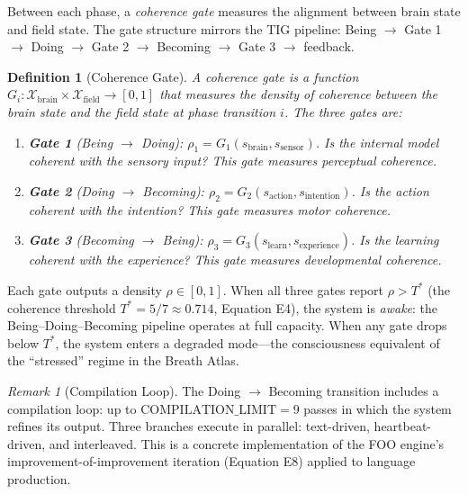 \documentclass[12pt, openany]{book}
\newtheorem{definition}[theorem]{Definition}
\theoremstyle{remark}
\newtheorem{remark}[theorem]{Remark}
\begin{document}
Between each phase, a \emph{coherence gate} measures the alignment between
brain state and field state.  The gate structure mirrors the TIG pipeline:
Being $\to$ Gate 1 $\to$ Doing $\to$ Gate 2 $\to$ Becoming $\to$ Gate 3
$\to$ feedback.

\begin{definition}[Coherence Gate]
\label{def:coherence-gate}
A \emph{coherence gate} is a function $G_i : \mathcal{X}_{\mathrm{brain}} \times
\mathcal{X}_{\mathrm{field}} \to [0, 1]$ that measures the density of coherence
between the brain state and the field state at phase transition $i$.  The three
gates are:
\begin{enumerate}
  \item \textbf{Gate 1} (Being $\to$ Doing): $\rho_1 = G_1(s_{\mathrm{brain}},
        s_{\mathrm{sensor}})$.  Is the internal model coherent with the sensory
        input?  This gate measures \emph{perceptual coherence}.
  \item \textbf{Gate 2} (Doing $\to$ Becoming): $\rho_2 = G_2(s_{\mathrm{action}},
        s_{\mathrm{intention}})$.  Is the action coherent with the intention?
        This gate measures \emph{motor coherence}.
  \item \textbf{Gate 3} (Becoming $\to$ Being): $\rho_3 = G_3(s_{\mathrm{learn}},
        s_{\mathrm{experience}})$.  Is the learning coherent with the experience?
        This gate measures \emph{developmental coherence}.
\end{enumerate}
\end{definition}

\noindent
Each gate outputs a density $\rho \in [0, 1]$.  When all three gates report
$\rho > T^*$ (the coherence threshold $T^* = 5/7 \approx 0.714$, Equation E4),
the system is \emph{awake}: the Being--Doing--Becoming pipeline operates at full
capacity.  When any gate drops below $T^*$, the system enters a degraded mode---the
consciousness equivalent of the ``stressed'' regime in the Breath Atlas.

\begin{remark}[Compilation Loop]
The Doing $\to$ Becoming transition includes a compilation loop: up to
$\mathrm{COMPILATION\_LIMIT} = 9$ passes in which the system refines its
output.  Three branches execute in parallel: text-driven, heartbeat-driven,
and interleaved.  This is a concrete implementation of the FOO engine's
improvement-of-improvement iteration (Equation E8) applied to language
production.
\end{remark}
\end{document}
